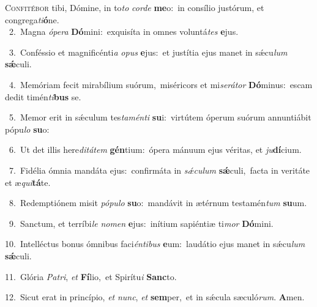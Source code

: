 \lettrine{\initial\textcolor{\initialcolor}{C}}{onfitébor} tibi, Dómine, in to\textit{to} \textit{cor}\-\textit{de} \textbf{me}\-o:~\star in consílio justórum, et congrega\-\textit{ti}\-\textbf{ó}ne.\\
{\numbfont\textcolor{\numbcolor}{~2.}}~Magna \textit{ó}\-\textit{pe}\textit{ra} \textbf{Dó}\-mini:~\star exquisíta in omnes voluntá\textit{tes} \textbf{e}\-jus.\par
{\numbfont\textcolor{\numbcolor}{~3.}}~Conféssio et magnificénti\textit{a} \textit{o}\-\textit{pus} \textbf{e}\-jus:~\star et justítia ejus manet in sǽcu\textit{lum} \textbf{sǽ}\-culi.\par
{\numbfont\textcolor{\numbcolor}{~4.}}~Memóriam fecit mirabílium suórum,~\dagger miséricors et mi\-\textit{se}\-\textit{rá}\textit{tor} \textbf{Dó}\-minus:~\star escam dedit timén\-\textit{ti}\-\textbf{bus} se.\par
{\numbfont\textcolor{\numbcolor}{~5.}}~Memor erit in sǽculum tes\-\textit{ta}\-\textit{mén}\textit{ti} \textbf{su}\-i:~\star virtútem óperum suórum annuntiábit pópu\textit{lo} \textbf{su}\-o:\par
{\numbfont\textcolor{\numbcolor}{~6.}}~Ut det illis here\-\textit{di}\-\textit{tá}\textit{tem} \textbf{gén}\-tium:~\star ópera mánuum ejus véritas, et \textit{ju}\-\textbf{dí}cium.\par
{\numbfont\textcolor{\numbcolor}{~7.}}~Fidélia ómnia mandáta ejus:~\dagger confirmáta in \textit{sǽ}\-\textit{cu}\textit{lum} \textbf{sǽ}\-culi,~\star facta in veritáte et æ\-\textit{qui}\-\textbf{tá}te.\par
{\numbfont\textcolor{\numbcolor}{~8.}}~Redemptiónem misit \textit{pó}\-\textit{pu}\textit{lo} \textbf{su}\-o:~\star mandávit in ætérnum testamén\textit{tum} \textbf{su}\-um.\par
{\numbfont\textcolor{\numbcolor}{~9.}}~Sanctum, et terríbi\textit{le} \textit{no}\-\textit{men} \textbf{e}\-jus:~\star inítium sapiéntiæ ti\textit{mor} \textbf{Dó}\-mini.\par
{\numbfont\textcolor{\numbcolor}{10.}}~Intelléctus bonus ómnibus faci\-\textit{én}\-\textit{ti}\textit{bus} \textbf{e}\-um:~\star laudátio ejus manet in sǽcu\textit{lum} \textbf{sǽ}\-culi.\par
{\numbfont\textcolor{\numbcolor}{11.}}~Glória \textit{Pa}\-\textit{tri}, \textit{et} \textbf{Fí}\-lio,~\star et Spirítu\textit{i} \textbf{Sanc}\-to.\par
{\numbfont\textcolor{\numbcolor}{12.}}~Sicut erat in princípio, \textit{et} \textit{nunc}\-, \textit{et} \textbf{sem}\-per,~\star et in sǽcula sæculó\-\textit{rum}\-. \textbf{A}\-men.\par
